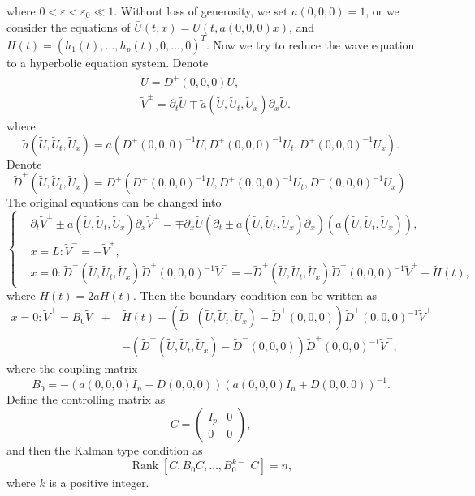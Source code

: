 \documentclass[a4paper,reqno,11pt]{amsart}
\numberwithin{equation}{section} %
\begin{document}
where $0 < \varepsilon < \varepsilon _0 \ll 1$.
Without loss of generosity, we set $a(0,0,0)=1$, or we consider the equations of $\bar{U}\left( t,x \right) =U\left( t,a\left( 0,0,0 \right) x \right) $, and $H(t)=\left(h_1(t), \ldots, h_p(t), 0, \ldots, 0\right)^T$. Now we try to reduce the wave equation to a hyperbolic equation system. Denote
$$
\begin{aligned}
& \tilde{U}=D^{+}(0,0,0) U ,\\
& \tilde{V}^{\pm}=\partial_t \tilde{U} \mp \tilde{a} \left(\tilde{U}, \tilde{U}_t, \tilde{U}_x\right) \partial_x \tilde{U}.
\end{aligned}
$$
where
$$
\tilde{a} \left(\tilde{U} , \tilde{U} _t, \tilde{U} _x\right)=a\left(D^{+}(0,0,0)^{-1} U, D^{+}(0,0,0)^{-1} U_t, D^{+}(0,0,0)^{-1} U_x\right) .
$$
Denote
$$
\tilde{D} ^{\pm}\left(\tilde{U} , \tilde{U} _t, \tilde{U} _x\right)=D^{\pm}\left(D^{+}(0,0,0)^{-1} U, D^{+}(0,0,0)^{-1} U_t, D^{+}(0,0,0)^{-1} U_x\right) .
$$
The original equations can be changed into
\begin{equation}\label{hyperbolic equations}
    \begin{cases}
    & \partial_t \tilde{V} ^{ \pm} \pm \tilde{a} \left(\tilde{U} , \tilde{U} _t, \tilde{U} _x\right) \partial_x \tilde{V} ^{ \pm}=\mp \partial_x \tilde{U} \left(\partial_t \pm \tilde{a} \left(\tilde{U} , \tilde{U} _t, \tilde{U} _x\right) \partial_x\right)\left(\tilde{a} \left(\tilde{U} , \tilde{U} _t, \tilde{U} _x\right)\right) ,\\
    & x=L:\tilde{ V} ^{-}=-\tilde{V} ^{+} ,\\
    & x=0: \tilde{D} ^{-}\left(\tilde{U} , \tilde{U} _t, \tilde{U} _x\right) \tilde{D} ^{+}(0,0,0)^{-1} \tilde{V} ^{-}=-\tilde{D} ^{+}\left(\tilde{U} , \tilde{U} _t, \tilde{U} _x\right) \tilde{D} ^{+}(0,0,0)^{-1} \tilde{V} ^{+}+\tilde{H} (t),
\end{cases}
\end{equation}
where $\tilde{H} (t)=2aH(t)$. Then the boundary condition can be written as
$$
\begin{aligned}
x=0: \widetilde{V}^{+}=B_0 \widetilde{V}^{-}+ & \widetilde{H}(t)-\left(\widetilde{D}^{-}\left(\widetilde{U}, \widetilde{U}_t, \widetilde{U}_x\right)-\widetilde{D}^{+}(0,0,0)\right) \widetilde{D}^{+}(0,0,0)^{-1} \widetilde{V}^{+} \\
& -\left(\widetilde{D}^{-}\left(\widetilde{U}, \widetilde{U}_t, \widetilde{U}_x\right)-\widetilde{D}^{-}(0,0,0)\right) \widetilde{D}^{+}(0,0,0)^{-1} \widetilde{V}^{-},
\end{aligned}
$$
where the coupling matrix 
$$
B_0=-\left(a(0,0,0) I_n-D(0,0,0)\right)\left(a(0,0,0) I_n+D(0,0,0)\right)^{-1} .
$$
Define the controlling matrix as 
$$
C=\left(\begin{array}{cc}
I_p & 0 \\
0 & 0
\end{array}\right) ,
$$
and then the Kalman type condition as
\begin{equation}\label{41}
    \operatorname{Rank}\left[C, B_0 C, \ldots, B_0^{k-1} C\right]=n,
\end{equation}
where $k$ is a positive integer.
\end{document}
